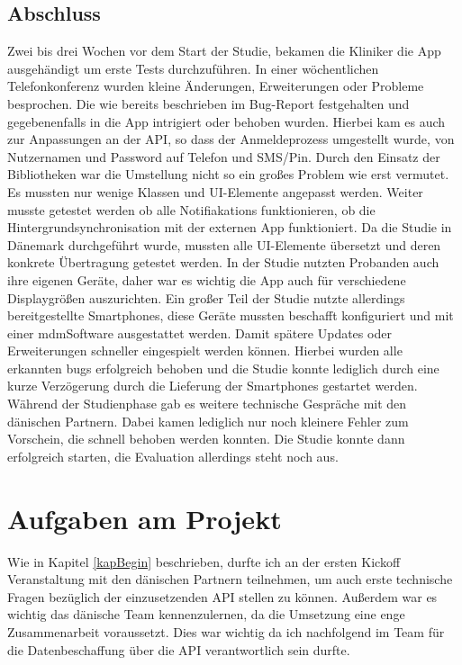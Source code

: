 \subsection{Abschluss}\label{abschluss}
Zwei bis drei Wochen vor dem Start der Studie, bekamen die Kliniker die App ausgehändigt um erste Tests durchzuführen. In einer wöchentlichen Telefonkonferenz wurden kleine Änderungen, Erweiterungen oder  Probleme besprochen. Die wie bereits beschrieben im Bug-Report festgehalten  und gegebenenfalls in die App intrigiert oder behoben wurden. Hierbei kam es auch  zur Anpassungen an der API, so dass der Anmeldeprozess umgestellt wurde, von Nutzernamen und Password auf Telefon und SMS/Pin. Durch den Einsatz der Bibliotheken war die Umstellung nicht so ein großes Problem wie erst vermutet. Es mussten nur wenige Klassen und UI-Elemente angepasst werden. Weiter musste getestet werden ob alle Notifiakations funktionieren, ob die Hintergrundsynchronisation mit der externen App funktioniert. Da die Studie in Dänemark durchgeführt wurde, mussten  alle UI-Elemente übersetzt und deren konkrete Übertragung getestet werden. In der Studie nutzten Probanden auch ihre eigenen Geräte, daher war es wichtig die App auch für verschiedene Displaygrößen auszurichten. Ein großer Teil der Studie nutzte allerdings bereitgestellte Smartphones, diese Geräte mussten beschafft konfiguriert und mit einer \ac{mdm}Software
ausgestattet werden. Damit spätere Updates oder Erweiterungen schneller eingespielt
 werden können. Hierbei wurden alle erkannten \gls{bug}s erfolgreich behoben und die Studie konnte lediglich durch eine kurze Verzögerung durch die Lieferung der Smartphones gestartet werden. Während der Studienphase gab es weitere technische Gespräche mit den dänischen Partnern. Dabei kamen lediglich nur noch kleinere Fehler zum Vorschein, die schnell behoben werden konnten. Die Studie konnte dann erfolgreich starten, die Evaluation allerdings steht noch aus.

\section{Aufgaben am Projekt}
Wie in Kapitel \ref{kapBegin} beschrieben, durfte ich an der ersten Kickoff Veranstaltung mit den dänischen Partnern teilnehmen, um auch erste technische Fragen bezüglich der einzusetzenden API stellen zu können. Außerdem war es wichtig das dänische Team kennenzulernen, da die Umsetzung eine enge Zusammenarbeit voraussetzt. Dies war wichtig da ich nachfolgend im Team für die Datenbeschaffung über die API verantwortlich sein durfte.

